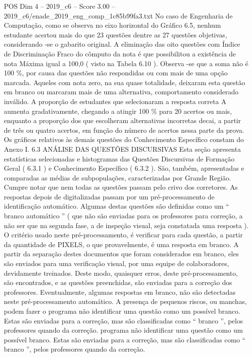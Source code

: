 \begin{textsample}{POS Dim 4 – 2019\_c6 – Score 3.00 – 2019\_c6/enade\_2019\_eng\_comp\_1c85b99fa3.txt}
No caso de Engenharia de Computação, como se observa no eixo horizontal do Gráfico 6.5, nenhum estudante acertou mais do que 23 questões dentre as 27 questões objetivas, considerando -se o gabarito original.
A eliminação das oito questões com Índice de Discriminação Fraco do cômputo da nota é que possibilitou a existência de nota Máxima igual a 100,0 ( visto na Tabela 6.10 ).
Observa -se que a soma não é 100 \%, por causa das questões não respondidas ou com mais de uma opção marcada.
Aqueles com nota zero, na sua quase totalidade, deixaram esta questão em branco ou marcaram mais de uma alternativa, comportamento considerado inválido.
A proporção de estudantes que selecionaram a resposta correta A aumenta gradativamente, chegando a atingir 100 \% para 20 acertos ou mais, enquanto a proporção dos que escolheram alternativas incorretas decai, a partir de três ou quatro acertos, em função do número de acertos nessa parte da prova.
Os gráficos relativos às demais questões do Conhecimento Específico constam do Anexo I. 6.3 ANÁLISE DAS QUESTÕES DISCURSIVAS Esta seção apresenta estatísticas selecionadas e histogramas das Questões Discursivas de Formação Geral ( 6.3.1 ) e Conhecimento Específico ( 6.3.2 ).
São, também, apresentadas e comparadas as médias de subpopulações, caracterizadas por Grande Região.
Cumpre notar que nem todas as questões passam pelo crivo dos corretores.
As respostas depois de digitalizadas passam por um pré-processamento de identificação automático.
Algumas destas questões são definidas como um “ branco automático ” ( que não são enviadas para os professores para correção, a não ser que na segunda fase, a de inspeção visual, seja constatada uma resposta ).
O critério usado neste pré-processamento, é verificar para cada questão, a partir da quantidade de PIXELS, o que provavelmente, é uma resposta em branco.
A partir da separação destes documentos que foram considerados em branco, eles são enviados para uma verificação visual, por uma equipe de colaboradores, devidamente treinados.
Deste modo, quaisquer erros, deste pré-processamento, são encontrados, e as questões preenchidas, são enviadas para a correção dos professores.
Eventualmente, algumas respostas em branco, não são detectadas neste pré-processamento automático.
A presença de pequenos riscos, ou manchas, podem fazer o programa não identificar uma questão como um possível branco.
Estas são enviadas para a correção, mas são classificadas como “ branco ”, pelos professores quando da correção. programa não identificar uma questão como um possível branco.
Estas são enviadas para a correção, mas são classificadas como “ branco ”, pelos professores quando da correção.

\end{textsample}
